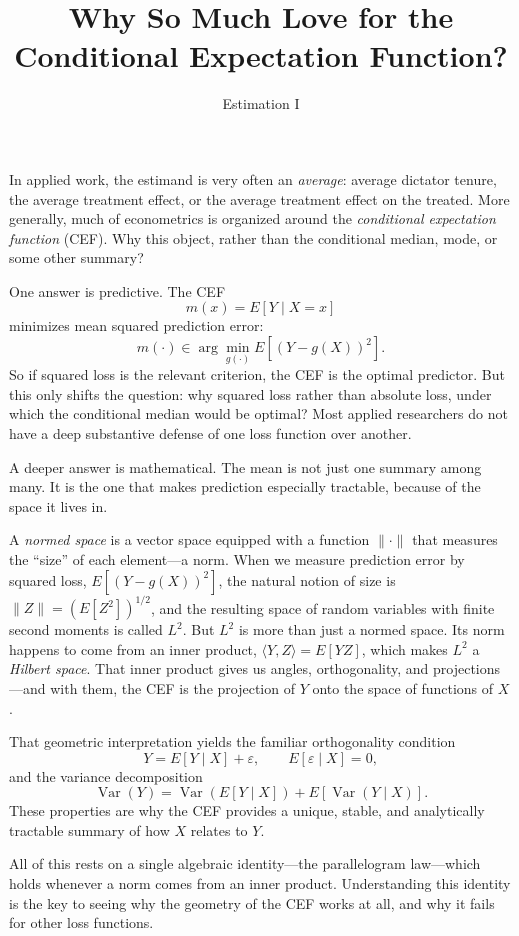 \documentclass[11pt]{article}
\title{\vspace{-1.5em}Why So Much Love for the Conditional Expectation Function?}
\author{Estimation I}
\date{}
\begin{document}
\maketitle
\vspace{-2.5em}

In applied work, the estimand is very often an \emph{average}: average dictator tenure, the average treatment effect, or the average treatment effect on the treated. More generally, much of econometrics is organized around the \emph{conditional expectation function} (CEF). Why this object, rather than the conditional median, mode, or some other summary?

One answer is predictive. The CEF
\[
m(x)=E[Y\mid X=x]
\]
minimizes mean squared prediction error:
\[
m(\cdot)\in \arg\min_{g(\cdot)} E[(Y-g(X))^2].
\]
So if squared loss is the relevant criterion, the CEF is the optimal predictor. But this only shifts the question: why squared loss rather than absolute loss, under which the conditional median would be optimal? Most applied researchers do not have a deep substantive defense of one loss function over another.

A deeper answer is mathematical. The mean is not just one summary among many. It is the one that makes prediction especially tractable, because of the space it lives in.

A \emph{normed space} is a vector space equipped with a function \(\|\cdot\|\) that measures the ``size'' of each element---a norm. When we measure prediction error by squared loss, \(E[(Y - g(X))^2]\), the natural notion of size is \(\|Z\| = (E[Z^2])^{1/2}\), and the resulting space of random variables with finite second moments is called \(L^2\). But \(L^2\) is more than just a normed space. Its norm happens to come from an inner product, \(\langle Y,Z\rangle = E[YZ]\), which makes \(L^2\) a \emph{Hilbert space}. That inner product gives us angles, orthogonality, and projections---and with them, the CEF is the projection of \(Y\) onto the space of functions of \(X\).

That geometric interpretation yields the familiar orthogonality condition
\[
Y=E[Y\mid X]+\varepsilon,
\qquad E[\varepsilon\mid X]=0,
\]
and the variance decomposition
\[
\operatorname{Var}(Y)
=
\operatorname{Var}(E[Y\mid X])
+
E[\operatorname{Var}(Y\mid X)].
\]
These properties are why the CEF provides a unique, stable, and analytically tractable summary of how \(X\) relates to \(Y\).

All of this rests on a single algebraic identity---the parallelogram law---which holds whenever a norm comes from an inner product. Understanding this identity is the key to seeing why the geometry of the CEF works at all, and why it fails for other loss functions.
\end{document}
